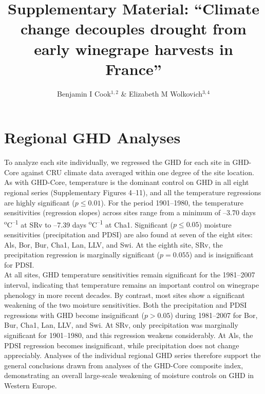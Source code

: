 \documentclass[12pt]{article}
\title{Supplementary Material: 
``Climate change decouples drought from early winegrape harvests in France''}
\author{Benjamin I Cook$^{1,2}$ \& Elizabeth M Wolkovich$^{3,4}$}
\begin{document}
\maketitle

\section*{Regional GHD Analyses}
\noindent To analyze each site individually, we regressed the GHD for each site in GHD-Core against CRU climate data averaged within one degree of the site location. As with GHD-Core, temperature is the dominant control on GHD in all eight regional series (Supplementary Figures 4--11), and all the temperature regressions are highly significant ($p\le0.01$). For the period 1901--1980, the temperature sensitivities (regression slopes) across sites range from a minimum of --3.70 days \textsuperscript{o}C\textsuperscript{--1} at SRv to --7.39 days \textsuperscript{o}C\textsuperscript{--1} at Cha1. Significant ($p\le0.05$) moisture sensitivities (precipitation and PDSI) are also found at seven of the eight sites: Als, Bor, Bur, Cha1, Lan, LLV, and Swi. At the eighth site, SRv, the precipitation regression is marginally significant ($p=0.055$) and is insignificant for PDSI.\\
\indent At all sites, GHD temperature sensitivities remain significant for the 1981--2007 interval, indicating that temperature remains an important control on winegrape phenology in more recent decades. By contrast, most sites show a significant weakening of the two moisture sensitivities. Both the precipitation and PDSI regressions with GHD become insignificant ($p>0.05$) during 1981--2007 for Bor, Bur, Cha1, Lan, LLV, and Swi. At SRv, only precipitation was marginally significant for 1901--1980, and this regression weakens considerably. At Als, the PDSI regression becomes insignificant, while precipitation does not change appreciably. Analyses of the individual regional GHD series therefore support the general conclusions drawn from analyses of the GHD-Core composite index, demonstrating an overall large-scale weakening of moisture controls on GHD in Western Europe.
\end{document}
